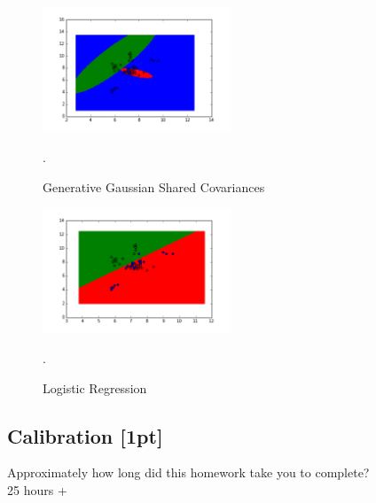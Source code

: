 \documentclass[submit]{harvardml}
\begin{document}
\begin{figure}[h]
	\centering
	\includegraphics[width=0.5\textwidth]{generative_result_separate_covariances}
	\caption{Generative Gaussian Shared Covariances}.
	\label{fig:shared}
\end{figure}

\begin{figure}[h]
	\centering
	\includegraphics[width=0.5\textwidth]{logistic_regression_result}
	\caption{Logistic Regression}.
	\label{fig:logistic}
\end{figure}

\clearpage
\subsection*{Calibration [1pt]}
Approximately how long did this homework take you to complete? \\
25 hours +
\end{document}

